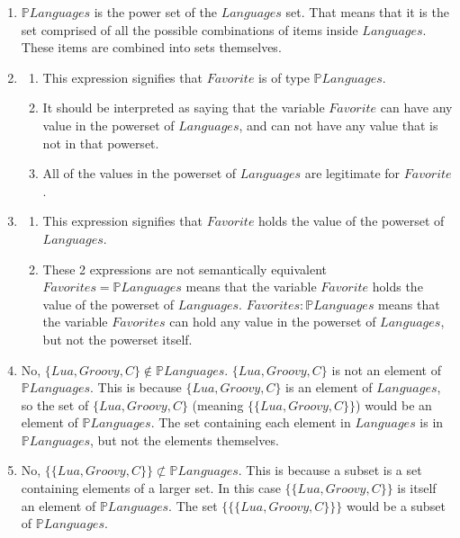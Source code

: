 \documentclass[12pt]{article}
\begin{document}
\begin{enumerate}
\item $\mathbb{P}Languages$ is the power set of the $Languages$ set. That means that it is the set comprised of all the possible combinations of items inside $Languages$. These items are combined into sets themselves. 
\item 
\begin{enumerate}
\item This expression signifies that $Favorite$ is of type $\mathbb{P}Languages$. 
\item It should be interpreted as saying that the variable $Favorite$ can have any value in the powerset of $Languages$, and can not have any value that is not in that powerset. 
\item All of the values in the powerset of $Languages$ are legitimate for $Favorite$. 
\end{enumerate}
\item 
\begin{enumerate}
\item This expression signifies that $Favorite$ holds the value of the powerset of $Languages$. 
\item These 2 expressions are not semantically equivalent $Favorites = \mathbb{P}Languages$ means that the variable  $Favorite$ holds the value of the powerset of $Languages$. $Favorites:\mathbb{P}Languages$ means that the variable $Favorites$ can hold any value in the powerset of $Languages$, but not the powerset itself.
\end{enumerate}
\item No, $\{Lua, Groovy, C\} \notin \mathbb{P}Languages$. $\{Lua, Groovy, C\}$ is not an element of $\mathbb{P}Languages$. This is because $\{Lua, Groovy, C\}$ is an element of $Languages$, so the set of $\{Lua, Groovy, C\} $ (meaning $\{\{Lua, Groovy, C\}\} $)  would be an element of $\mathbb{P}Languages$. The set containing each element in $Languages$ is in $\mathbb{P}Languages$, but not the elements themselves.

\item No, $\{\{Lua, Groovy, C\}\} \not\subset \mathbb{P}Languages$. This is because a subset is a set containing elements of a larger set. In this case $\{\{Lua, Groovy, C\}\}$ is itself an element of $\mathbb{P}Languages$. The set  $\{\{\{Lua, Groovy, C\}\}\}$ would be a subset of $\mathbb{P}Languages$.


\end{enumerate}
\end{document}
